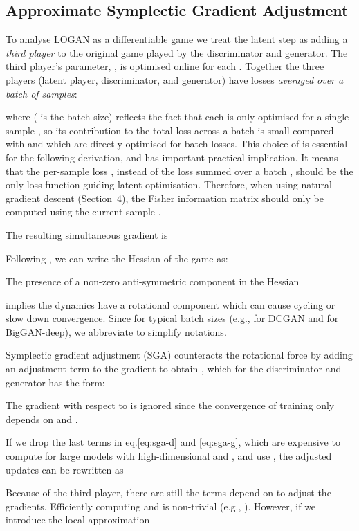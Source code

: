 \documentclass{article} \usepackage{iclr2020_conference,times}
\begin{document}
\subsection{Approximate Symplectic Gradient Adjustment}
\label{app:approx-sga}

To analyse LOGAN as a differentiable game we treat the latent step  as adding a \emph{third player} to the original game played by the discriminator and generator. The third player's parameter, , is optimised online for each . Together the three players (latent player, discriminator, and generator) have losses \emph{averaged over a batch of samples}:

where  ( is the batch size) reflects the fact that each  is only optimised for a single sample , so its contribution to the total loss across a batch is small compared with  and  which are directly optimised for batch losses. This choice of  is essential for the following derivation, and has important practical implication. It means that the per-sample loss , instead of the loss summed over a batch , should be the only loss function guiding latent optimisation. Therefore, when using natural gradient descent (Section~4), the Fisher information matrix should only be computed using the current sample .

The resulting simultaneous gradient is

Following \cite{balduzzi2018mechanics}, we can write the Hessian of the game as:


The presence of a non-zero anti-symmetric component in the Hessian

implies the dynamics have a rotational component which can cause cycling or slow down convergence. 
Since  for typical batch sizes (e.g.,  for DCGAN and  for BigGAN-deep), we abbreviate  to simplify notations. 

Symplectic gradient adjustment (SGA) counteracts the rotational force by adding an adjustment term to the gradient to obtain , which for the discriminator and generator has the form:

The gradient with respect to  is ignored since the convergence of training only depends on  and . 

If we drop the last terms in eq.\ref{eq:sga-d} and \ref{eq:sga-g}, which are expensive to compute for large models with high-dimensional  and , and use , the adjusted updates can be rewritten as

Because of the third player, there are still the terms depend on  to adjust the gradients. Efficiently computing  and  is non-trivial (e.g., \citealt{pearlmutter1994fast}). 
However, if we introduce the local approximation
\end{document}
